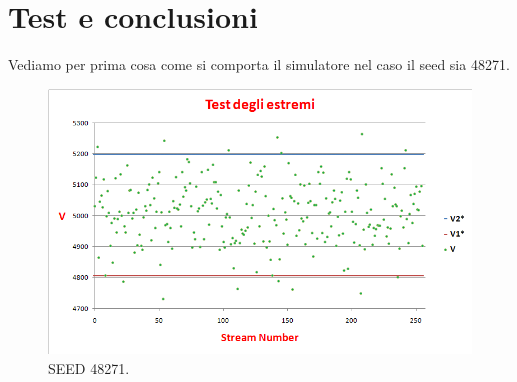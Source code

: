\section{Test e conclusioni}
\noindent Vediamo per prima cosa come si comporta il simulatore nel caso il seed sia 48271.

\begin{figure}[H]
  \centering
  \includegraphics[scale=0.55]{img/result_48271.png}
  \caption[Test degli estremi]{SEED 48271.}
  \label{fig:result_48271}
\end{figure}

